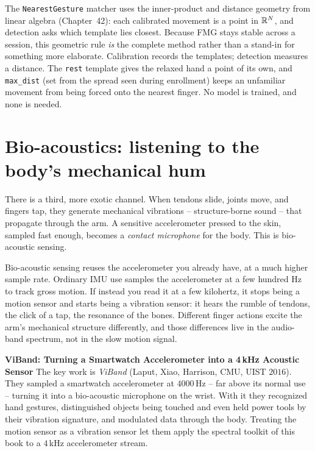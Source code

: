 \begin{connectionbox}
The \texttt{NearestGesture} matcher uses the inner-product and distance
geometry from linear algebra (Chapter~42): each calibrated movement is a point in
$\mathbb{R}^{N}$, and detection asks which template lies closest. Because FMG stays stable
across a session, this geometric rule \emph{is} the complete method
rather than a stand-in for something more elaborate. Calibration records the templates;
detection measures a distance. The \texttt{rest} template gives the relaxed hand a
point of its own, and \texttt{max\_dist} (set from the spread seen during enrollment)
keeps an unfamiliar movement from being forced onto the nearest finger. No model is
trained, and none is needed.
\end{connectionbox}

\section{Bio-acoustics: listening to the body's mechanical hum}
\label{ch37:bioacoustic}

There is a third, more exotic channel. When tendons slide, joints move, and fingers
tap, they generate mechanical vibrations -- structure-borne sound -- that propagate
through the arm. A sensitive accelerometer pressed to the skin, sampled fast enough,
becomes a \emph{contact microphone} for the body. This is bio-acoustic sensing.

\begin{happeningbox}
Bio-acoustic sensing reuses the accelerometer you already
have, at a much higher sample rate. Ordinary IMU use samples the
accelerometer at a few hundred Hz to track gross motion. If instead you read it at a
few kilohertz, it stops being a motion sensor and starts being a vibration sensor: it
hears the rumble of tendons, the click of a tap, the resonance of the bones. Different
finger actions excite the arm's mechanical structure differently, and those
differences live in the audio-band spectrum, not in the slow motion signal.
\end{happeningbox}

\begin{applicationbox}
\textbf{ViBand: Turning a Smartwatch Accelerometer into a 4\,kHz Acoustic Sensor}
The key work is \emph{ViBand} (Laput, Xiao, Harrison, CMU, UIST $2016$). They
sampled a smartwatch accelerometer at $4000$\,Hz -- far above its normal use -- turning
it into a bio-acoustic microphone on the wrist. With it they recognized hand gestures,
distinguished objects being touched and even held power tools by their vibration
signature, and modulated data through the body. Treating the motion
sensor as a vibration sensor let them apply the spectral toolkit of this book
to a $4$\,kHz accelerometer stream.
\end{applicationbox}

